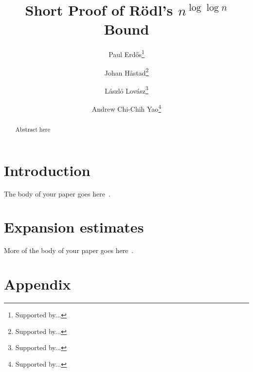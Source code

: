 \documentclass{aic}
\begin{document}
\begin{frontmatter}[classification=text]

\title{Short Proof of R\"odl's $n^{\log\log n}$ Bound} %

\author[pgom]{Paul Erd\H{o}s\thanks{Supported by...}}
\author[johan]{Johan H{\aa}stad\thanks{Supported by...}}
\author[laci]{L\'aszl\'o Lov\'asz\thanks{Supported by...}}
\author[andy]{Andrew Chi-Chih Yao\thanks{Supported by...}}

\begin{abstract}
Abstract here
\end{abstract}
\end{frontmatter}

\section{Introduction}
 The body of your paper goes here~\cite{cilleruelo}.

\newpage %

\section{Expansion estimates}

 More of the body of your paper goes here~\cite{bergelson-johnson-moreira}.

\appendix %
\section*{Appendix}
\end{document}
